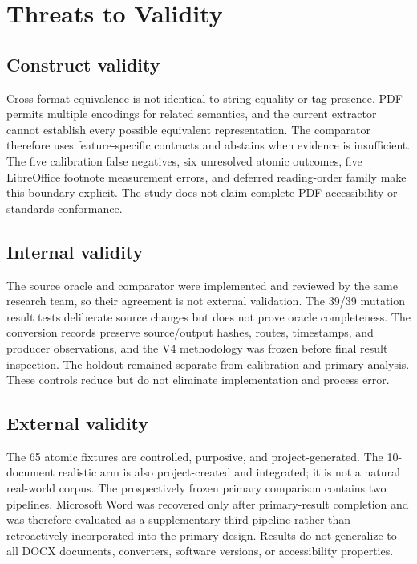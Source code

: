 \section{Threats to Validity}
\label{sec:threats}

\subsection{Construct validity}
Cross-format equivalence is not identical to string equality or tag presence. PDF permits multiple encodings for related semantics, and the current extractor cannot establish every possible equivalent representation. The comparator therefore uses feature-specific contracts and abstains when evidence is insufficient. The five calibration false negatives, six unresolved atomic outcomes, five LibreOffice footnote measurement errors, and deferred reading-order family make this boundary explicit. The study does not claim complete PDF accessibility or standards conformance.

\subsection{Internal validity}
The source oracle and comparator were implemented and reviewed by the same research team, so their agreement is not external validation. The 39/39 mutation result tests deliberate source changes but does not prove oracle completeness. The conversion records preserve source/output hashes, routes, timestamps, and producer observations, and the V4 methodology was frozen before final result inspection. The holdout remained separate from calibration and primary analysis. These controls reduce but do not eliminate implementation and process error.

\subsection{External validity}
The 65 atomic fixtures are controlled, purposive, and project-generated. The 10-document realistic arm is also project-created and integrated; it is not a natural real-world corpus. The prospectively frozen primary comparison contains two pipelines. Microsoft Word was recovered only after primary-result completion and was therefore evaluated as a supplementary third pipeline rather than retroactively incorporated into the primary design. Results do not generalize to all DOCX documents, converters, software versions, or accessibility properties.

